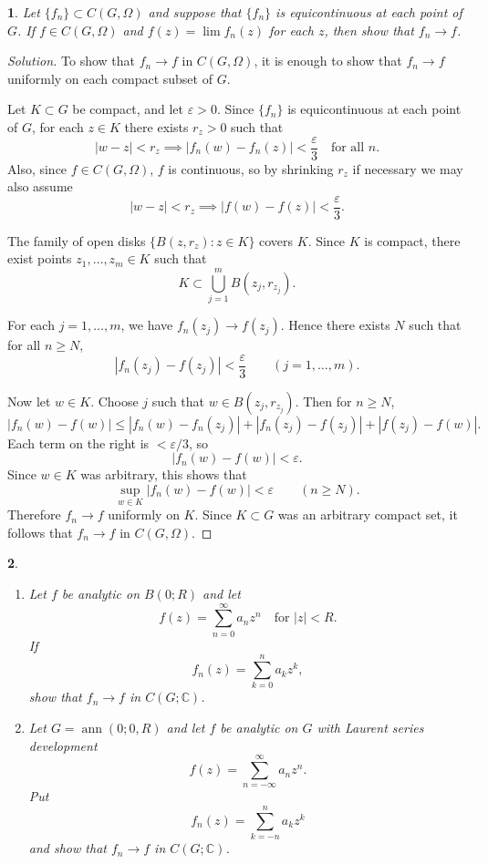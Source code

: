 \documentclass[12pt, a4paper]{report}
\theoremstyle{spaced}
\newtheorem{exercise}{}
\newcommand{\setexercise}[1]{\setcounter{exercise}{#1-1}}
\begin{document}
\setexercise{7}
\begin{exercise}
	Let $\{f_n\}\subset C(G,\Omega)$ and suppose that $\{f_n\}$ is equicontinuous at each point of $G$.
	If $f\in C(G,\Omega)$ and $f(z)=\lim f_n(z)$ for each $z$, then show that $f_n\to f$.
\end{exercise}

\begin{proof}[Solution]
	To show that \(f_n\to f\) in \(C(G,\Omega)\), it is enough to show that \(f_n\to f\) uniformly on each compact subset of \(G\).

	Let \(K\subset G\) be compact, and let \(\varepsilon>0\). Since \(\{f_n\}\) is equicontinuous at each point of \(G\), for each \(z\in K\) there exists \(r_z>0\) such that
	\[
		|w-z|<r_z \implies |f_n(w)-f_n(z)|<\frac{\varepsilon}{3}
		\quad \text{for all } n.
	\]
	Also, since \(f\in C(G,\Omega)\), \(f\) is continuous, so by shrinking \(r_z\) if necessary we may also assume
	\[
		|w-z|<r_z \implies |f(w)-f(z)|<\frac{\varepsilon}{3}.
	\]

	The family of open disks \(\{B(z,r_z): z\in K\}\) covers \(K\). Since \(K\) is compact, there exist points \(z_1,\dots,z_m\in K\) such that
	\[
		K\subset \bigcup_{j=1}^m B(z_j,r_{z_j}).
	\]

	For each \(j=1,\dots,m\), we have \(f_n(z_j)\to f(z_j)\). Hence there exists \(N\) such that for all \(n\ge N\),
	\[
		|f_n(z_j)-f(z_j)|<\frac{\varepsilon}{3}
		\qquad (j=1,\dots,m).
	\]

	Now let \(w\in K\). Choose \(j\) such that \(w\in B(z_j,r_{z_j})\). Then for \(n\ge N\),
	\[
		|f_n(w)-f(w)|
		\le |f_n(w)-f_n(z_j)| + |f_n(z_j)-f(z_j)| + |f(z_j)-f(w)|.
	\]
	Each term on the right is \(<\varepsilon/3\), so
	\[
		|f_n(w)-f(w)|<\varepsilon.
	\]
	Since \(w\in K\) was arbitrary, this shows that
	\[
		\sup_{w\in K}|f_n(w)-f(w)|<\varepsilon
		\qquad (n\ge N).
	\]
	Therefore \(f_n\to f\) uniformly on \(K\).
	Since \(K\subset G\) was an arbitrary compact set, it follows that \(f_n\to f\) in \(C(G,\Omega)\).
\end{proof}

\setexercise{8}
\begin{exercise}
	\begin{enumerate}[label=(\alph*)]
		\item Let $f$ be analytic on $B(0;R)$ and let
		      \[
			      f(z)=\sum_{n=0}^{\infty} a_n z^n \quad \text{for } |z|<R.
		      \]
		      If
		      \[
			      f_n(z)=\sum_{k=0}^{n} a_k z^k,
		      \]
		      show that $f_n\to f$ in $C(G;\mathbb{C})$.

		\item Let $G=\operatorname{ann}(0;0,R)$ and let $f$ be analytic on $G$ with Laurent series development
		      \[
			      f(z)=\sum_{n=-\infty}^{\infty} a_n z^n.
		      \]
		      Put
		      \[
			      f_n(z)=\sum_{k=-n}^{n} a_k z^k
		      \]
		      and show that $f_n\to f$ in $C(G;\mathbb{C})$.
	\end{enumerate}
\end{exercise}
\end{document}

